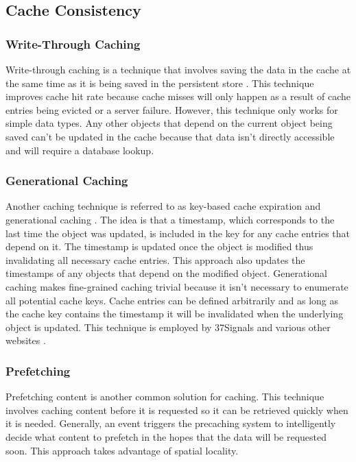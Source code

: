 \documentclass[12pt]{ucthesis}
\begin{document}
\subsection{Cache Consistency}
\subsubsection{Write-Through Caching}
Write-through caching is a technique that involves saving the data in the cache at the same time as it is being saved in the persistent store \cite{writeThroughCaching}.
This technique improves cache hit rate because cache misses will only happen as a result of cache entries being evicted or a server failure.
However, this technique only works for simple data types.
Any other objects that depend on the current object being saved can't be updated in the cache because that data isn't directly accessible and will require a database lookup.

\subsubsection{Generational Caching}
Another caching technique is referred to as key-based cache expiration \cite{keyBasedCacheExpiration} and generational caching \cite{generationalCaching}.
The idea is that a timestamp, which corresponds to the last time the object was updated, is included in the key for any cache entries that depend on it.
The timestamp is updated once the object is modified thus invalidating all necessary cache entries.
This approach also updates the timestamps of any objects that depend on the modified object.
Generational caching makes fine-grained caching trivial because it isn't necessary to enumerate all potential cache keys.
Cache entries can be defined arbitrarily and as long as the cache key contains the timestamp it will be invalidated when the underlying object is updated.
This technique is employed by 37Signals and various other websites \cite{keyBasedCacheExpiration}.

\subsubsection{Prefetching}
Prefetching content is another common solution for caching.
This technique involves caching content before it is requested so it can be retrieved quickly when it is needed.
Generally, an event triggers the precaching system to intelligently decide what content to prefetch in the hopes that the data will be requested soon.
This approach takes advantage of spatial locality.
\end{document}
